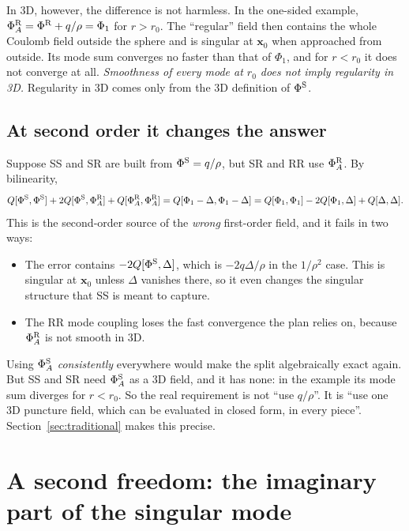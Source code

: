 \documentclass[11pt,a4paper]{article}
\newcommand{\PhiS}{\Phi^{\rm S}}
\newcommand{\PhiR}{\Phi^{\rm R}}
\newcommand{\x}{\mathbf{x}}
\begin{document}
In 3D, however, the difference is not harmless.
In the one-sided example, $\PhiR_A=\PhiR+q/\rho=\Phi_1$ for $r>r_0$.
The ``regular'' field then contains the whole Coulomb field outside the sphere and is singular at $\x_0$ when approached from outside.
Its mode sum converges no faster than that of $\Phi_1$, and for $r<r_0$ it does not converge at all.
\emph{Smoothness of every mode at $r_0$ does not imply regularity in 3D.}
Regularity in 3D comes only from the 3D definition of $\PhiS$.

\subsection{At second order it changes the answer}
Suppose SS and SR are built from $\PhiS=q/\rho$, but SR and RR use $\PhiR_A$.
By bilinearity,
\begin{equation}
Q[\PhiS,\PhiS]+2Q[\PhiS,\PhiR_A]+Q[\PhiR_A,\PhiR_A]
=Q[\Phi_1-\Delta,\Phi_1-\Delta]
=Q[\Phi_1,\Phi_1]-2Q[\Phi_1,\Delta]+Q[\Delta,\Delta].
\end{equation}
This is the second-order source of the \emph{wrong} first-order field, and it fails in two ways:
\begin{itemize}[nosep]
\item The error contains $-2Q[\PhiS,\Delta]$, which is $-2q\Delta/\rho$ in the $1/\rho^2$ case.
  This is singular at $\x_0$ unless $\Delta$ vanishes there, so it even changes the singular structure that SS is meant to capture.
\item The RR mode coupling loses the fast convergence the plan relies on, because $\PhiR_A$ is not smooth in 3D.
\end{itemize}
Using $\PhiS_A$ \emph{consistently} everywhere would make the split algebraically exact again.
But SS and SR need $\PhiS_A$ as a 3D field, and it has none: in the example its mode sum diverges for $r<r_0$.
So the real requirement is not ``use $q/\rho$''.
It is ``use one 3D puncture field, which can be evaluated in closed form, in every piece''.
Section~\ref{sec:traditional} makes this precise.

\section{A second freedom: the imaginary part of the singular mode}\label{sec:imag}
\end{document}
